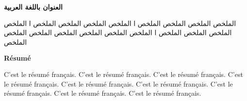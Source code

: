 \documentclass[sommairechap,stylejchiquet]{these_gi}
\begin{document}

 
\tableofcontents
 
\listoffigures
\listoftables
\afterpreface
 
\adjustmtc

\adjustmtc
 








 
 


 
%
 
%    
%
 
 
%
 
 


\begin{arabtex}
\begin{center}

\textbf{العنوان باللغة العربية} 
\end{center}


الملخص   الملخص   الملخص    الملخص
ا
الملخص   الملخص   الملخص    الملخص
ا
الملخص   الملخص   الملخص    الملخص
ا
الملخص   الملخص   الملخص    الملخص
الملخص الملخص   الملخص
\end{arabtex}

\begin{center}
\textbf{Résumé} 
\end{center}

C'est le résumé français. C'est le résumé français. C'est le résumé français. C'est le résumé français. C'est le résumé français. C'est le résumé français. C'est le résumé français. C'est le résumé français. C'est le résumé français. 
\end{document}
